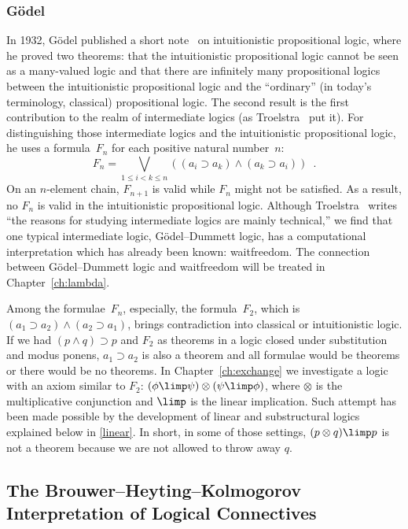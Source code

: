 \subsubsection{G\"odel}
In 1932, G\"odel published a short note~\cite{godelprop} on intuitionistic propositional
logic, where he proved two theorems: that the intuitionistic propositional logic
cannot be seen as a many-valued logic and that
there are infinitely many propositional logics between the
intuitionistic propositional logic and the ``ordinary'' (in today's
terminology, classical) propositional logic.  The second result is the
first contribution to the realm of intermediate logics (as
Troelstra~\cite[p.~223]{goedelcollected} put it).
For distinguishing those intermediate logics and the intuitionistic
propositional logic, he uses a formula~$F_n$ for each positive natural
number~$n$:
\[
 F_n = \bigvee_{1\le i < k\le n}\left((a_i\supset a_k) \land (a_k\supset a_i)\right)\enspace.
\]
On an $n$-element chain, $F_{n+1}$ is valid while $F_n$ might not be
satisfied.  As a result, no $F_n$ is valid in the intuitionistic
propositional logic.
Although Troelstra~\cite[p.~223]{goedelcollected} writes ``the reasons
for studying intermediate logics are mainly technical,'' we find that
one typical intermediate logic, G\"odel--Dummett logic, has a
computational interpretation which has already been known: waitfreedom.
The connection between G\"odel--Dummett logic and waitfreedom will be
treated in Chapter~\ref{ch:lambda}.

Among the formulae~$F_n$,
especially, the formula~$F_2$, which is $(a_1\supset a_2)\land (a_2\supset
a_1)$, brings contradiction into classical or intuitionistic logic.  If we
had $(p\land q)\supset p$ and $F_2$ as theorems in a logic closed under
substitution and modus ponens,
$a_1\supset a_2$ is also a theorem and all formulae would be theorems or
there would be no theorems.
In Chapter~\ref{ch:exchange} we investigate a logic with an axiom similar to $F_2$:
$(\phi\limp\psi)\otimes(\psi\limp\phi)$, where $\otimes$ is the
multiplicative conjunction and $\limp$ is the linear implication.  Such
attempt has been made possible by the development of linear and
substructural logics explained below in \ref{linear}.
In short, in some of those settings, $(p\otimes q)\limp p$ is
not a theorem because we are not
allowed to throw away $q$.

\subsection{The Brouwer--Heyting--Kolmogorov Interpretation of Logical Connectives}

